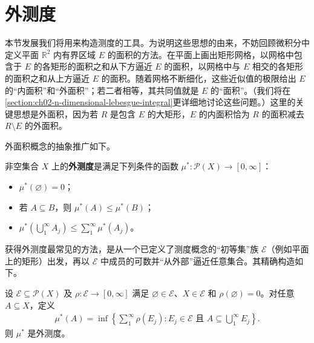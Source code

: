 \documentclass[../../main.tex]{subfiles}%
\begin{document}
\section{外测度}\label{section:ch01-outer-measures}

本节发展我们将用来构造测度的工具。为说明这些思想的由来，不妨回顾微积分中定义平面 $\mathbb{R}^2$ 内有界区域 $E$ 的面积的方法。在平面上画出矩形网格，以网格中包含于 $E$ 的各矩形的面积之和从下方逼近 $E$ 的面积，以网格中与 $E$ 相交的各矩形的面积之和从上方逼近 $E$ 的面积。随着网格不断细化，这些近似值的极限给出 $E$ 的“内面积”和“外面积”；若二者相等，其共同值就是 $E$ 的“面积”。（我们将在\cref{section:ch02-n-dimensional-lebesgue-integral}更详细地讨论这些问题。）这里的关键思想是外面积，因为若 $R$ 是包含 $E$ 的大矩形，$E$ 的内面积恰为 $R$ 的面积减去 $R\setminus E$ 的外面积。

外面积概念的抽象推广如下。
\begin{definition}[外测度]\label{definition:ch01-outer-measure-definition}
非空集合 $X$ 上的\textbf{外测度}是满足下列条件的函数 $\mu^*:\mathscr{P}(X)\to[0,\infty]$：
\begin{itemize}
\item $\mu^*(\varnothing)=0$；
\item 若 $A\subseteq B$，则 $\mu^*(A)\leqslant\mu^*(B)$；
\item $\mu^*(\bigcup_1^\infty A_j)\leqslant\sum_1^\infty\mu^*(A_j)$。
\end{itemize}
\end{definition}


获得外测度最常见的方法，是从一个已定义了测度概念的“初等集”族 $\mathscr{E}$（例如平面上的矩形）出发，再以 $\mathscr{E}$ 中成员的可数并“从外部”逼近任意集合。其精确构造如下。

\begin{proposition}\label{proposition:ch01-outer-measure-construction}
设 $\mathscr{E}\subseteq\mathscr{P}(X)$ 及 $\rho:\mathscr{E}\to[0,\infty]$ 满足 $\varnothing\in\mathscr{E}$、$X\in\mathscr{E}$ 和 $\rho(\varnothing)=0$。对任意 $A\subseteq X$，定义
\begin{align*}
\mu^*(A)=\inf\left\{\sum_1^\infty\rho(E_j):E_j\in\mathscr{E}\text{ 且 }A\subseteq\bigcup_1^\infty E_j\right\}.
\end{align*}
则 $\mu^*$ 是外测度。
\end{proposition}
\end{document}
